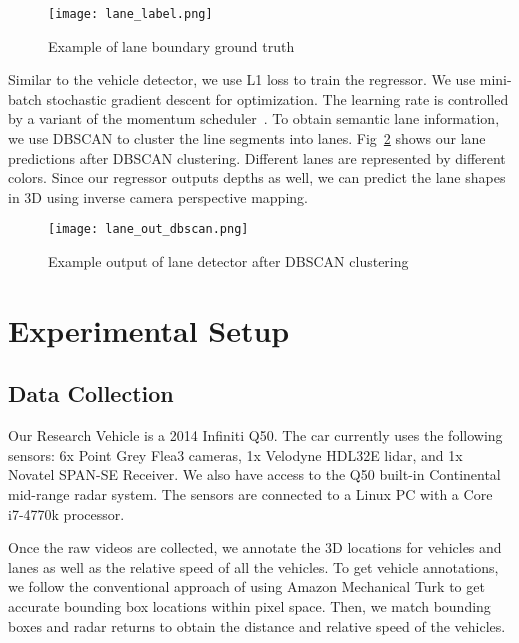 \documentclass[journal]{IEEEtran}
\begin{document}
\begin{figure}[tb]
  \centering
    \texttt{[image: lane\_label.png]}
 \caption{Example of lane boundary ground truth}
 \label{fig:lane-gt}
\end{figure}

Similar to the vehicle detector, we use L1 loss to train the regressor. We use mini-batch stochastic gradient descent for optimization. The learning rate is controlled by a variant of the momentum scheduler~\cite{sutskever-2013}. To obtain semantic lane information, we use DBSCAN to cluster the line segments into lanes. Fig~\ref{fig:lane-out-dbscan} shows our lane predictions after DBSCAN clustering. Different lanes are represented by different colors. Since our regressor outputs depths as well, we can predict the lane shapes in 3D using inverse camera perspective mapping.


\begin{figure}[tb]
  \centering
    \texttt{[image: lane\_out\_dbscan.png]}
 \caption{Example output of lane detector after DBSCAN clustering}
 \label{fig:lane-out-dbscan}
\end{figure}

\section{Experimental Setup}

\subsection{Data Collection}
Our Research Vehicle is a 2014 Infiniti Q50. The car currently uses the following sensors: 6x Point Grey Flea3 cameras, 1x Velodyne HDL32E lidar, and 1x Novatel SPAN-SE Receiver. We also have access to the Q50 built-in Continental mid-range radar system. The sensors are connected to a Linux PC with a Core i7-4770k processor.

Once the raw videos are collected, we annotate the 3D locations for vehicles and lanes as well as the relative speed of all the vehicles. To get vehicle annotations, we follow the conventional approach of using Amazon Mechanical Turk to get accurate bounding box locations within pixel space. Then, we match bounding boxes and radar returns to obtain the distance and relative speed of the vehicles.
\end{document}
